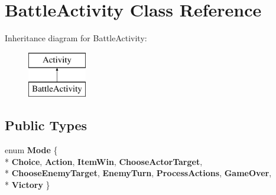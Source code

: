 \hypertarget{classBattleActivity}{\section{Battle\-Activity Class Reference}
\label{classBattleActivity}
}
Inheritance diagram for Battle\-Activity\-:\begin{figure}[H]
\begin{center}
\leavevmode
\includegraphics[height=2.000000cm]{classBattleActivity}
\end{center}
\end{figure}
\subsection*{Public Types}
\begin{DoxyCompactItemize}
\item 
enum {\bfseries Mode} \{ \\*
{\bfseries Choice}, 
{\bfseries Action}, 
{\bfseries Item\-Win}, 
{\bfseries Choose\-Actor\-Target}, 
\\*
{\bfseries Choose\-Enemy\-Target}, 
{\bfseries Enemy\-Turn}, 
{\bfseries Process\-Actions}, 
{\bfseries Game\-Over}, 
\\*
{\bfseries Victory}
 \}
\end{DoxyCompactItemize}
